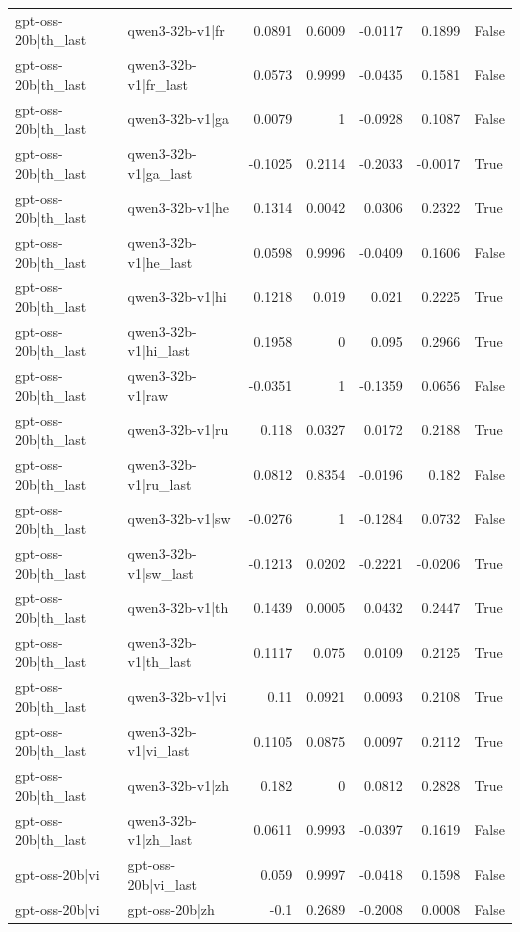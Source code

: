 \begin{table}
\begin{tabular}{l l r r r r l}
gpt-oss-20b|th_last & qwen3-32b-v1|fr & 0.0891 & 0.6009 & -0.0117 & 0.1899 & False \\
gpt-oss-20b|th_last & qwen3-32b-v1|fr_last & 0.0573 & 0.9999 & -0.0435 & 0.1581 & False \\
gpt-oss-20b|th_last & qwen3-32b-v1|ga & 0.0079 & 1 & -0.0928 & 0.1087 & False \\
gpt-oss-20b|th_last & qwen3-32b-v1|ga_last & -0.1025 & 0.2114 & -0.2033 & -0.0017 & True \\
gpt-oss-20b|th_last & qwen3-32b-v1|he & 0.1314 & 0.0042 & 0.0306 & 0.2322 & True \\
gpt-oss-20b|th_last & qwen3-32b-v1|he_last & 0.0598 & 0.9996 & -0.0409 & 0.1606 & False \\
gpt-oss-20b|th_last & qwen3-32b-v1|hi & 0.1218 & 0.019 & 0.021 & 0.2225 & True \\
gpt-oss-20b|th_last & qwen3-32b-v1|hi_last & 0.1958 & 0 & 0.095 & 0.2966 & True \\
gpt-oss-20b|th_last & qwen3-32b-v1|raw & -0.0351 & 1 & -0.1359 & 0.0656 & False \\
gpt-oss-20b|th_last & qwen3-32b-v1|ru & 0.118 & 0.0327 & 0.0172 & 0.2188 & True \\
gpt-oss-20b|th_last & qwen3-32b-v1|ru_last & 0.0812 & 0.8354 & -0.0196 & 0.182 & False \\
gpt-oss-20b|th_last & qwen3-32b-v1|sw & -0.0276 & 1 & -0.1284 & 0.0732 & False \\
gpt-oss-20b|th_last & qwen3-32b-v1|sw_last & -0.1213 & 0.0202 & -0.2221 & -0.0206 & True \\
gpt-oss-20b|th_last & qwen3-32b-v1|th & 0.1439 & 0.0005 & 0.0432 & 0.2447 & True \\
gpt-oss-20b|th_last & qwen3-32b-v1|th_last & 0.1117 & 0.075 & 0.0109 & 0.2125 & True \\
gpt-oss-20b|th_last & qwen3-32b-v1|vi & 0.11 & 0.0921 & 0.0093 & 0.2108 & True \\
gpt-oss-20b|th_last & qwen3-32b-v1|vi_last & 0.1105 & 0.0875 & 0.0097 & 0.2112 & True \\
gpt-oss-20b|th_last & qwen3-32b-v1|zh & 0.182 & 0 & 0.0812 & 0.2828 & True \\
gpt-oss-20b|th_last & qwen3-32b-v1|zh_last & 0.0611 & 0.9993 & -0.0397 & 0.1619 & False \\
gpt-oss-20b|vi & gpt-oss-20b|vi_last & 0.059 & 0.9997 & -0.0418 & 0.1598 & False \\
gpt-oss-20b|vi & gpt-oss-20b|zh & -0.1 & 0.2689 & -0.2008 & 0.0008 & False \\

\end{tabular}
\end{table}
